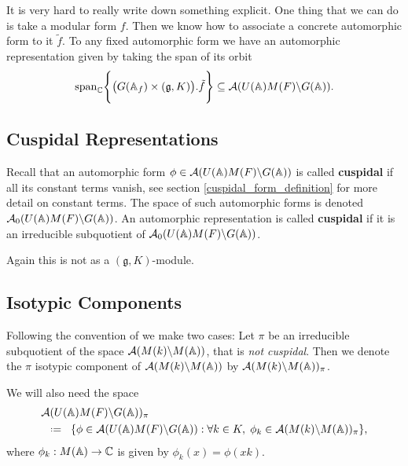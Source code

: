 \begin{example}
    It is very hard to really write down something explicit. One thing that we can do is take a modular form \(f\). Then we know how to associate a concrete automorphic form to it \(\tilde{f}\). To any fixed automorphic form we have an automorphic representation given by taking the span of its orbit
    \[\mathrm{span}_\C \Biggl\{\big(G(\A_f)\times (\mathfrak{g}, K)\big).\tilde{f}\Biggr\} \subseteq \mathcal{A}(U(\A)M(F)\backslash G(\A)).\]
\end{example}

\subsection{Cuspidal Representations}
Recall that an automorphic form \(\phi\in \mathcal{A}(U(\A)M(F) \backslash G(\A))\) is called \textbf{cuspidal}  if all its constant terms vanish, see section \ref{cuspidal_form_definition} for more detail on constant terms.
The space of such automorphic forms is denoted \(\mathcal{A}_0(U(\A)M(F) \backslash G(\A))\). An automorphic representation is called \textbf{cuspidal} if it is an irreducible subquotient of \(\mathcal{A}_0(U(\A)M(F) \backslash G(\A))\).

\begin{remark}
    Again this is not as a \((\mathfrak{g}, K)\)-module.
\end{remark}

\subsection{Isotypic Components}\label{automorphic_isotypic_subspaces}
Following the convention of \cite[II.1]{moeglinSpectralDecompositionEisenstein1995} we make two cases:
Let \(\pi\) be an irreducible subquotient of the space \(\mathcal{A}(M(k) \backslash M(\A))\), that is \textit{not cuspidal}. Then we denote the \(\pi\) isotypic component of \(\mathcal{A}(M(k) \backslash M(\A))\) by \(\mathcal{A}(M(k) \backslash M(\A))_\pi\).

We will also need the space 
\begin{align*}
	&\mathcal{A}(U(\A)M(F) \backslash G(\A))_\pi \\ &\defeq \{\phi \in \mathcal{A}(U(\A)M(F) \backslash G(\A)) : \forall k\in K, \; \phi_k\in\mathcal{A}(M(k) \backslash M(\A))_\pi \},
\end{align*}
where \(\phi_k: M(\A) \to \C\) is given by \(\phi_k(x) = \phi(xk)\).

